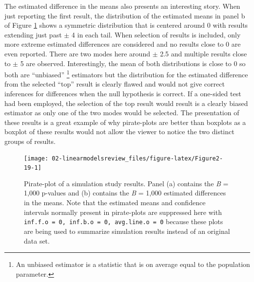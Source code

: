 \documentclass[
]{book}
\begin{document}
\indent The estimated difference in the means also presents an interesting story. When just reporting the first result, the distribution of the estimated means in panel b of Figure \ref{fig:Figure2-19} shows a symmetric distribution that is centered around 0 with results extending just past \(\pm\) 4 in each tail. When selection of results is included, only more extreme estimated differences are considered and no results close to 0 are even reported. There are two modes here around \(\pm\) 2.5 and multiple results close to \(\pm\) 5 are observed. Interestingly, the mean of both distributions is close to 0 so both are ``unbiased'' \footnote{An unbiased estimator  is a statistic that is on average equal to the population parameter.} estimators but the distribution for the estimated difference from the selected ``top'' result is clearly flawed and would not give correct inferences for differences when the null hypothesis is correct. If a one-sided test had been employed, the selection of the top result would result is a clearly biased estimator as only one of the two modes would be selected. The presentation of these results is a great example of why pirate-plots are better than boxplots as a boxplot of these results would not allow the viewer to notice the two distinct groups of results.



\begin{figure}[ht!]

{\centering \texttt{[image: 02-linearmodelsreview\_files/figure-latex/Figure2-19-1]} 

}

\caption{Pirate-plot of a simulation study results. Panel (a) contains the \emph{B} = 1,000 p-values and (b) contains the \emph{B} = 1,000 estimated differences in the means. Note that the estimated means and confidence intervals normally present in pirate-plots are suppressed here with \texttt{inf.f.o\ =\ 0,\ inf.b.o\ =\ 0,\ avg.line.o\ =\ 0} because these plots are being used to summarize simulation results instead of an original data set.}\label{fig:Figure2-19}
\end{figure}

\newpage
\end{document}
